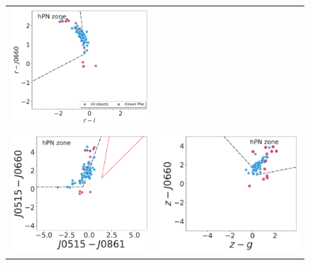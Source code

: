 \documentclass[11pt]{article}
\newcommand\raiselabel[1]{\raisebox{0.9\figwidth}[-0.5\figwidth]{#1}}
\begin{document}
\begin{figure}
\centering
\begin{tabular}{l l}
\includegraphics[width=0.5\linewidth, trim=10 10 10 10, clip]{figs-pca-v1/Fig1-PN-pc-Halpha_emitters_threeerror-cleaning-limfilter-limcolor-flags-mask-broad-vironen-v2.pdf} & \\
 \includegraphics[width=0.5\linewidth, trim=10 10 10 10, clip]{figs-pca-v1/Fig2-PN-pc-Halpha_emitters_threeerror-cleaning-limfilter-limcolor-flags-mask-broad-J0515_J0660-v2.pdf} & \includegraphics[width=0.5\linewidth, trim=10 10 10 10, clip]{figs-pca-v1/Fig3-PN-pc-Halpha_emitters_threeerror-cleaning-limfilter-limcolor-flags-mask-broad-z-v2.pdf} \\

\end{tabular}
\end{figure}
\end{document}
